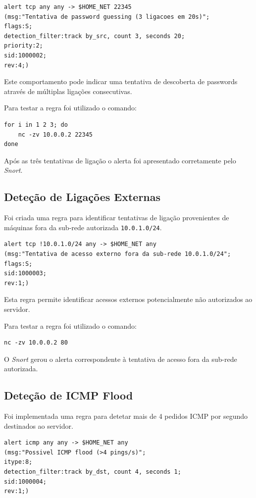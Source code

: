 \documentclass{article}
\begin{document}
\begin{lstlisting}
alert tcp any any -> $HOME_NET 22345
(msg:"Tentativa de password guessing (3 ligacoes em 20s)";
flags:S;
detection_filter:track by_src, count 3, seconds 20;
priority:2;
sid:1000002;
rev:4;)
\end{lstlisting}

Este comportamento pode indicar uma tentativa de descoberta de passwords através de múltiplas ligações consecutivas.

Para testar a regra foi utilizado o comando:

\begin{lstlisting}
for i in 1 2 3; do
    nc -zv 10.0.0.2 22345
done
\end{lstlisting}

Após as três tentativas de ligação o alerta foi apresentado corretamente pelo \textit{Snort}.

\subsection{Deteção de Ligações Externas}

Foi criada uma regra para identificar tentativas de ligação provenientes de máquinas fora da sub-rede autorizada \texttt{10.0.1.0/24}.

\begin{lstlisting}
alert tcp !10.0.1.0/24 any -> $HOME_NET any
(msg:"Tentativa de acesso externo fora da sub-rede 10.0.1.0/24";
flags:S;
sid:1000003;
rev:1;)
\end{lstlisting}

Esta regra permite identificar acessos externos potencialmente não autorizados ao servidor.

Para testar a regra foi utilizado o comando:

\begin{lstlisting}
nc -zv 10.0.0.2 80
\end{lstlisting}

O \textit{Snort} gerou o alerta correspondente à tentativa de acesso fora da sub-rede autorizada.

\subsection{Deteção de ICMP Flood}

Foi implementada uma regra para detetar mais de 4 pedidos ICMP por segundo destinados ao servidor.

\begin{lstlisting}
alert icmp any any -> $HOME_NET any
(msg:"Possivel ICMP flood (>4 pings/s)";
itype:8;
detection_filter:track by_dst, count 4, seconds 1;
sid:1000004;
rev:1;)
\end{lstlisting}
\end{document}
